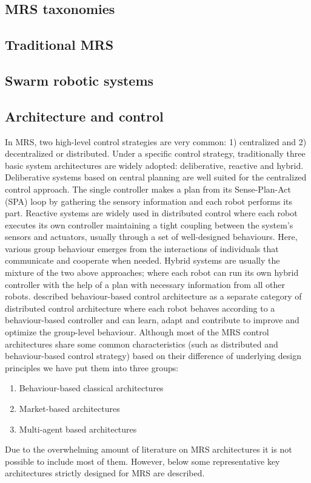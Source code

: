 \subsection{MRS taxonomies}
\label{bg:mrs:taxonomies}
\subsection{Traditional MRS}
\label{bg:mrs:tmrs}
\subsection{Swarm robotic systems}
\label{bg:mrs:sr}
\subsection*{Architecture and control}
\label{bg:mrs:arch}
In MRS, two high-level control strategies are very common: 1) centralized and 2) decentralized or distributed. Under a specific control strategy, traditionally three basic system architectures are widely adopted: deliberative, reactive and hybrid. Deliberative systems based on central planning are well suited for the centralized control approach. The single controller makes a plan from its Sense-Plan-Act (SPA) loop by gathering the sensory information and each robot performs its part. Reactive systems are widely used in distributed control where each robot executes its own controller maintaining a tight coupling between the system's sensors and actuators, usually through a set of well-designed behaviours. Here, various group behaviour emerges from the interactions of individuals that communicate and cooperate when needed. Hybrid systems are usually the mixture of the two above approaches; where each robot can run its own hybrid controller with the help of a plan with necessary information from all other robots. \cite{Mataric2007} described behaviour-based control architecture as a separate category of distributed control architecture where each robot behaves according to a behaviour-based controller and can learn, adapt and contribute to improve and optimize the group-level behaviour. 
Although most of the MRS control architectures share some common characteristics (such as distributed and behaviour-based control strategy) based on their difference of underlying design principles we have put them into three groups:
\begin{enumerate}
\item Behaviour-based classical architectures
\item Market-based architectures
\item Multi-agent based architectures
\end{enumerate}
Due to the overwhelming amount of literature on MRS architectures it is not possible to include most of them. However, below some representative key architectures strictly designed for MRS are described. 
